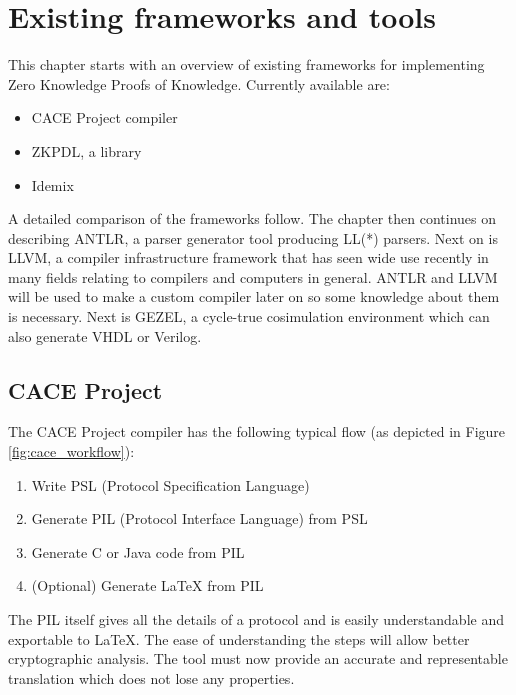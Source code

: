 \chapter{Existing frameworks and tools}

This chapter starts with an overview of existing frameworks for
implementing Zero Knowledge Proofs of Knowledge. Currently available
are:
\begin{itemize}
\item CACE Project compiler
\item ZKPDL, a library
\item Idemix
\end{itemize}
A detailed comparison of the frameworks follow.
The chapter then continues on describing ANTLR, a parser generator
tool producing LL(*) parsers.  Next on is LLVM, a compiler
infrastructure framework that has seen wide use recently in many
fields relating to compilers and computers in general. ANTLR and LLVM
will be used to make a custom compiler later on so some knowledge
about them is necessary. Next is GEZEL, a cycle-true cosimulation
environment which can also generate VHDL or Verilog.

\section{CACE Project}

The CACE Project compiler has the following typical flow (as depicted
in Figure \ref{fig:cace_workflow}):
\begin{enumerate}
\item Write PSL (Protocol Specification Language)
\item Generate PIL (Protocol Interface Language) from PSL
\item Generate C or Java code from PIL
\item (Optional) Generate LaTeX from PIL
\end{enumerate}

The PIL itself gives all the details of a protocol and is easily
understandable and exportable to LaTeX. The ease of understanding
the steps will allow better cryptographic analysis. The tool must
now provide an accurate and representable translation which does not
lose any properties.

